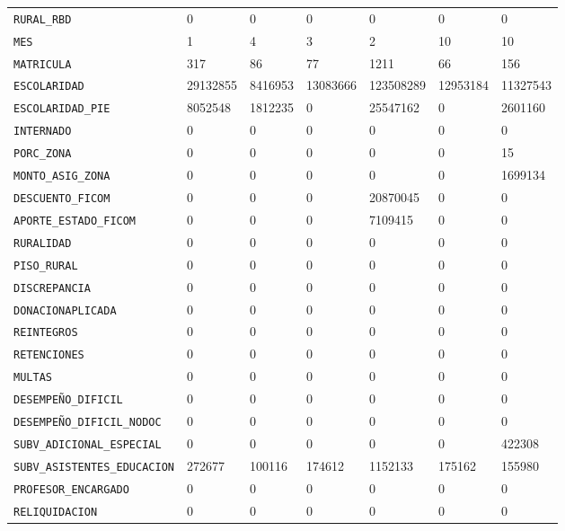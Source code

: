 \documentclass[10pt]{article}
\begin{document}
\begin{xltabular}{\linewidth}{@{}p{4.3cm} Y Y Y Y Y Y @{}}
\texttt{RURAL\_\allowbreak{}RBD} & 0 & 0 & 0 & 0 & 0 & 0 \\
\texttt{MES} & 1 & 4 & 3 & 2 & 10 & 10 \\
\texttt{MATRICULA} & 317 & 86 & 77 & 1211 & 66 & 156 \\
\texttt{ESCOLARIDAD} & 29132855 & 8416953 & 13083666 & 123508289 & 12953184 & 11327543 \\
\texttt{ESCOLARIDAD\_\allowbreak{}PIE} & 8052548 & 1812235 & 0 & 25547162 & 0 & 2601160 \\
\texttt{INTERNADO} & 0 & 0 & 0 & 0 & 0 & 0 \\
\texttt{PORC\_\allowbreak{}ZONA} & 0 & 0 & 0 & 0 & 0 & 15 \\
\texttt{MONTO\_\allowbreak{}ASIG\_\allowbreak{}ZONA} & 0 & 0 & 0 & 0 & 0 & 1699134 \\
\texttt{DESCUENTO\_\allowbreak{}FICOM} & 0 & 0 & 0 & 20870045 & 0 & 0 \\
\texttt{APORTE\_\allowbreak{}ESTADO\_\allowbreak{}FICOM} & 0 & 0 & 0 & 7109415 & 0 & 0 \\
\texttt{RURALIDAD} & 0 & 0 & 0 & 0 & 0 & 0 \\
\texttt{PISO\_\allowbreak{}RURAL} & 0 & 0 & 0 & 0 & 0 & 0 \\
\texttt{DISCREPANCIA} & 0 & 0 & 0 & 0 & 0 & 0 \\
\texttt{DONACIONAPLICADA} & 0 & 0 & 0 & 0 & 0 & 0 \\
\texttt{REINTEGROS} & 0 & 0 & 0 & 0 & 0 & 0 \\
\texttt{RETENCIONES} & 0 & 0 & 0 & 0 & 0 & 0 \\
\texttt{MULTAS} & 0 & 0 & 0 & 0 & 0 & 0 \\
\texttt{DESEMPEÑO\_\allowbreak{}DIFICIL} & 0 & 0 & 0 & 0 & 0 & 0 \\
\texttt{DESEMPEÑO\_\allowbreak{}DIFICIL\_\allowbreak{}NODOC} & 0 & 0 & 0 & 0 & 0 & 0 \\
\texttt{SUBV\_\allowbreak{}ADICIONAL\_\allowbreak{}ESPECIAL} & 0 & 0 & 0 & 0 & 0 & 422308 \\
\texttt{SUBV\_\allowbreak{}ASISTENTES\_\allowbreak{}EDUCACION} & 272677 & 100116 & 174612 & 1152133 & 175162 & 155980 \\
\texttt{PROFESOR\_\allowbreak{}ENCARGADO} & 0 & 0 & 0 & 0 & 0 & 0 \\
\texttt{RELIQUIDACION} & 0 & 0 & 0 & 0 & 0 & 0 \\

\end{xltabular}
\end{document}
